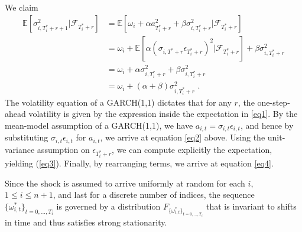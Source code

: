 \documentclass{uiucthesis2021}
\theoremstyle{definition}
\newenvironment{proof-of-proposition}[1][{}]{\noindent{\bf
    Proof of Proposition {#1}}
  \hspace*{.5em}}{\qed\bigskip\\}
\newenvironment{proof-of-lemma}[1][{}]{\noindent{\bf
Proof of Lemma {#1}}
\hspace*{.5em}}{\qed\bigskip\\}
\begin{document}
\begin{proof-of-proposition}[\ref{decay_prop}]
  We claim
  \begin{align}
  \mathbb{E}[ \sigma^{2}_{i,T_{i}^{*}+r+1} |\mathcal{F}_{T_{i}^{*}+r}] & = \mathbb{E}[\omega_{i} + \alpha a_{T_{i}^{*}+r}^{2} + \beta\sigma^{2}_{i,T_{i}^{*}+r} |\mathcal{F}_{T_{i}^{*}+r}] \label{eq1}\\
  & = \omega_{i} + \mathbb{E}[\alpha(\sigma_{i,T^{*}+r}\epsilon_{T_{i}^{*}+r})^{2} |\mathcal{F}_{T_{i}^{*}+r}] + \beta\sigma^{2}_{i,T_{i}^{*}+r} \label{eq2}\\
  & = \omega_{i} + \alpha\sigma_{i,T_{i}^{*}+r}^{2} + \beta\sigma^{2}_{i,T_{i}^{*}+r} \label{eq3}\\
  & = \omega_{i} + (\alpha + \beta) \sigma^{2}_{i,T_{i}^{*}+r}\label{eq4} \text{ .}
  \end{align}
  The volatility equation of a GARCH(1,1) dictates that for any $r$, the one-step-ahead volatility is given by the expression inside the expectation in \eqref{eq1}.  By the mean-model assumption of a GARCH(1,1), we have $a_{i,t} = \sigma_{i,t}\epsilon_{i,t}$, and hence by substituting $\sigma_{i,t}\epsilon_{i,t}$ for $a_{i,t}$, we arrive at equation \eqref{eq2} above.  Using the unit-variance assumption on $\epsilon_{T_{i}^{*}+r}$, we can compute explicitly the expectation, yielding (\ref{eq3}).  Finally, by rearranging terms, we arrive at equation \eqref{eq4}.
  \end{proof-of-proposition}

  \begin{proof-of-lemma}[\ref{lemma_ref}]
    Since the shock is assumed to arrive uniformly at random for each $i$, $1 \leq i \leq n + 1$, and last for a discrete number of indices, the sequence $\{\omega_{i,t}^{*}\}_{t=0,...,T_i}$ is governed by a distribution $F_{\{\omega_{i,t}^{*}\}_{t=0,...,T_i}}$ that is invariant to shifts in time and thus satisfies strong stationarity.
    \end{proof-of-lemma}
    
\end{document}
